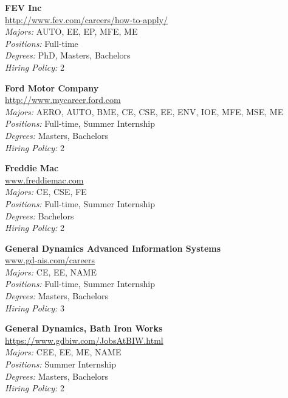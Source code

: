 \documentclass{article}
\begin{document}
\begin{center}
\begin{multicols}{3}
\begin{minipage}{.9\columnwidth}{\Large\bf FEV Inc }\\
	\url{http://www.fev.com/careers/how-to-apply/}\\
	\emph{Majors:} AUTO, EE, EP, MFE, ME\\
	\emph{Positions:} Full-time\\
	\emph{Degrees:} PhD, Masters, Bachelors\\
	\emph{Hiring Policy:} 2\\
\end{minipage}
 
\begin{minipage}{.9\columnwidth}{\Large\bf Ford Motor Company }\\
	\url{http://www.mycareer.ford.com}\\
	\emph{Majors:} AERO, AUTO, BME, CE, CSE, EE, ENV, IOE, MFE, MSE, ME\\
	\emph{Positions:} Full-time, Summer Internship\\
	\emph{Degrees:} Masters, Bachelors\\
	\emph{Hiring Policy:} 2\\
\end{minipage}
 
\begin{minipage}{.9\columnwidth}{\Large\bf Freddie Mac }\\
	\url{www.freddiemac.com}\\
	\emph{Majors:} CE, CSE, FE\\
	\emph{Positions:} Full-time, Summer Internship\\
	\emph{Degrees:} Bachelors\\
	\emph{Hiring Policy:} 2\\
\end{minipage}
 
\begin{minipage}{.9\columnwidth}{\Large\bf General Dynamics Advanced Information Systems }\\
	\url{www.gd-ais.com/careers}\\
	\emph{Majors:} CE, EE, NAME\\
	\emph{Positions:} Full-time, Summer Internship\\
	\emph{Degrees:} Masters, Bachelors\\
	\emph{Hiring Policy:} 3\\
\end{minipage}
 
\begin{minipage}{.9\columnwidth}{\Large\bf General Dynamics, Bath Iron Works }\\
	\url{https://www.gdbiw.com/JobsAtBIW.html}\\
	\emph{Majors:} CEE, EE, ME, NAME\\
	\emph{Positions:} Summer Internship\\
	\emph{Degrees:} Masters, Bachelors\\
	\emph{Hiring Policy:} 2\\
\end{minipage}
 

\end{multicols}
\end{center}
\end{document}
